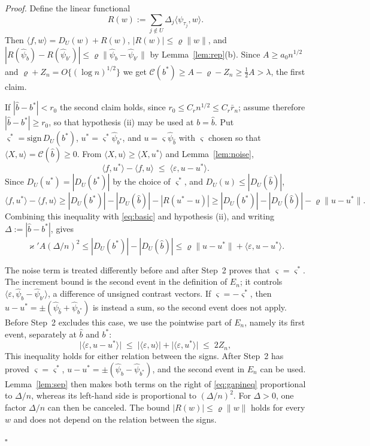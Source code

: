 \documentclass[12pt, a4paper]{article}
\newcommand{\qed}{\hfill$\square$}
\newenvironment{proof}[1][Proof]{\par\noindent\textit{#1.}\space}{\qed\par\medskip}
\begin{document}
\begin{proof}
Define the linear functional
\[
R(w):=\sum_{j\notin U}\Delta_j\langle\psi_{\tau_j},w\rangle.
\]
Then $\langle f,w\rangle=D_U(w)+R(w)$,
$|R(w)|\le\varrho\|w\|$, and
$|R(\hat\psi_b)-R(\hat\psi_{b'})|
\le\varrho\|\hat\psi_b-\hat\psi_{b'}\|$ by Lemma~\ref{lem:rep}(b). Since $A \ge a_0n^{1/2}$ and
$\varrho + Z_n = O\{(\log n)^{1/2}\}$ we get
$\mathcal{C}(b^*) \ge A - \varrho - Z_n \ge \tfrac12 A > \lambda$, the first
claim.

If $|\hat b - b^*| < r_0$ the second claim holds, since $r_0 \le C_r n^{1/2} \le C_r \bar r_n$; assume therefore $|\hat b - b^*| \ge r_0$, so that hypothesis (ii) may be used at $b = \hat b$. Put $\varsigma^* = \mathrm{sign}\, D_U(b^*)$, $u^* = \varsigma^*\hat\psi_{b^*}$,
and $u = \varsigma \hat\psi_{\hat b}$ with $\varsigma$ chosen so that
$\langle X,u\rangle = \mathcal{C}(\hat b) \ge 0$. From
$\langle X,u\rangle \ge \langle X,u^*\rangle$ and Lemma~\ref{lem:noise},
\begin{equation}
\label{eq:basic}
\langle f,u^*\rangle - \langle f,u\rangle \;\le\;
\langle \varepsilon, u - u^*\rangle .
\end{equation}
Since $D_U(u^*)=|D_U(b^*)|$ by the choice of $\varsigma^*$, and
$D_U(u)\le|D_U(\hat b)|$,
\[
\langle f,u^*\rangle-\langle f,u\rangle
\ge |D_U(b^*)|-|D_U(\hat b)|-|R(u^*-u)|
\ge |D_U(b^*)|-|D_U(\hat b)|-\varrho\|u-u^*\|.
\]
Combining this inequality with \eqref{eq:basic} and hypothesis (ii), and
writing $\Delta:=|\hat b-b^*|$, gives
\begin{equation}
\label{eq:gapineq}
\varkappa' A(\Delta/n)^2
\le |D_U(b^*)|-|D_U(\hat b)|
\le \varrho\|u-u^*\|+\langle\varepsilon,u-u^*\rangle.
\end{equation}

The noise term is treated differently before and after Step~2 proves that
$\varsigma=\varsigma^*$. The increment bound is the second event in the
definition of $E_n$; it controls
$\langle\varepsilon,\hat\psi_b-\hat\psi_{b'}\rangle$, a difference of
unsigned contrast vectors. If $\varsigma=-\varsigma^*$, then
$u-u^*=\pm(\hat\psi_{\hat b}+\hat\psi_{b^*})$ is instead a sum, so the second
event does not apply. Before Step~2 excludes this case, we use the pointwise
part of $E_n$, namely its first event, separately at $\hat b$ and $b^*$:
\[
\big| \langle\varepsilon, u-u^*\rangle \big| \;\le\; \big|\langle\varepsilon,u\rangle\big| + \big|\langle\varepsilon,u^*\rangle\big| \;\le\; 2Z_n ,
\]
This inequality holds for either relation between the signs. After Step~2 has
proved $\varsigma=\varsigma^*$,
$u-u^*=\pm(\hat\psi_{\hat b}-\hat\psi_{b^*})$, and the second event in $E_n$
can be used. Lemma~\ref{lem:sep} then makes both terms on the right of
\eqref{eq:gapineq} proportional to $\Delta/n$, whereas its left-hand side is
proportional to $(\Delta/n)^2$. For $\Delta>0$, one factor $\Delta/n$ can then
be canceled. The bound $|R(w)|\le\varrho\|w\|$ holds for every $w$ and does
not depend on the relation between the signs.


\end{proof}
\end{document}
